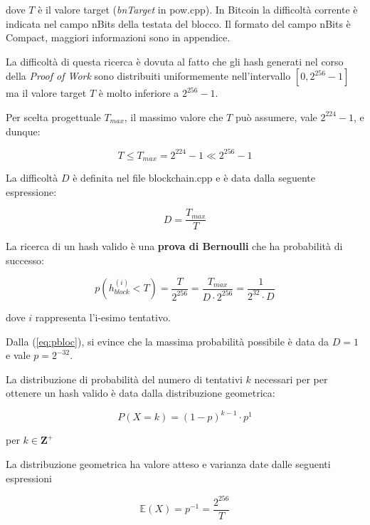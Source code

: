 \documentclass{article}
\begin{document}
dove $T$ è il valore target (\textit{bnTarget} in pow.cpp). In Bitcoin la difficoltà corrente è indicata nel campo nBits della testata del blocco.
Il formato del campo nBits è Compact, maggiori informazioni sono in appendice.

La difficoltà di questa ricerca è dovuta al fatto che gli hash generati nel corso della \textit{Proof of Work} sono distribuiti uniformemente nell'intervallo $ \left [0, 2^{256} - 1 \right ]$ ma il valore target $T$ è molto inferiore a $2^{256} - 1$. 

Per scelta progettuale $T_{max}$, il massimo valore che $T$ può assumere, vale $2^{224} - 1$, e dunque:

\begin{equation}
    T \le T_{max} = 2^{224} - 1 \ll 2^{256} - 1 \label{target_value}
\end{equation}

La difficoltà $D$ è definita nel file blockchain.cpp e è data dalla seguente espressione:

\begin{equation}
    D = \frac{T_{max}}{T} \label{diff}
\end{equation}

La ricerca di un hash valido è una \textbf{prova di Bernoulli} che ha probabilità di successo:

\begin{equation}
    \label{eq:pbloc}
    p(h_{block}^{(i)} < T) = \frac{T}{2^{256}} =\frac{T_{max}}{D \cdot 2^{256}} = \frac{1}{2^{32} \cdot D}
\end{equation}

dove $i$ rappresenta l'i-esimo tentativo.

Dalla (\ref{eq:pbloc}), si evince che la massima probabilità possibile è data da $D = 1$ e vale $p = 2^{-32}$.

La distribuzione di probabilità del numero di tentativi $k$ necessari per per ottenere un hash valido è data dalla distribuzione geometrica:

\begin{equation}
    P(X = k) = (1 - p)^{k-1} \cdot p^{1} \label{distribuzione_geometrica}
\end{equation}

per $k \in \mathbf{Z}^{+}$

La distribuzione geometrica ha valore atteso e varianza date dalle seguenti espressioni

\begin{equation}
    \mathbb{E}(X) = p^{-1} = \frac{2^{256}}{T} \label{valore atteso}
\end{equation}
\end{document}
